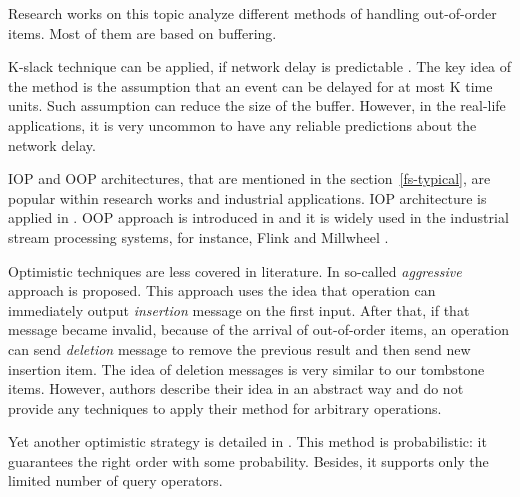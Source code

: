 
\label {fs-related}

Research works on this topic analyze different methods of handling out-of-order items. Most of them are based on buffering.

K-slack technique can be applied, if network delay is predictable \cite{Babu:2004:EKC:1016028.1016032, Li:2007:ESP:1270388.1270975}. The key idea of the method is the assumption that an event can be delayed for at most K time units. Such assumption can reduce the size of the buffer. However, in the real-life applications, it is very uncommon to have any reliable predictions about the network delay.

IOP and OOP architectures, that are mentioned in the section~\ref{fs-typical}, are popular within research works and industrial applications. IOP architecture is applied in \cite{Cranor:2003:GSD:872757.872838, Abadi:2003:ANM:950481.950485, Arasu:2006:CCQ:1146461.1146463, Ding:2004:EWJ:1031171.1031189, Hammad:2003:SSW:1315451.1315478, Hammad:2005:OIE:1116877.1116897}. OOP approach is introduced in \cite{Li:2008:OPN:1453856.1453890} and it is widely used in the industrial stream processing systems, for instance, Flink \cite{carbone2015apache} and Millwheel \cite{Akidau:2013:MFS:2536222.2536229}.

Optimistic techniques are less covered in literature. In \cite{Wei:2009:SSO:1559845.1559973} so-called {\it aggressive} approach is proposed. This approach uses the idea that operation can immediately output {\it insertion} message on the first input. After that, if that message became invalid, because of the arrival of out-of-order items, an operation can send {\it deletion} message to remove the previous result and then send new insertion item. The idea of deletion messages is very similar to our tombstone items. However, authors describe their idea in an abstract way and do not provide any techniques to apply their method for arbitrary operations.

Yet another optimistic strategy is detailed in \cite{Li2011}. This method is probabilistic: it guarantees the right order with some probability. Besides, it supports only the limited number of query operators.

